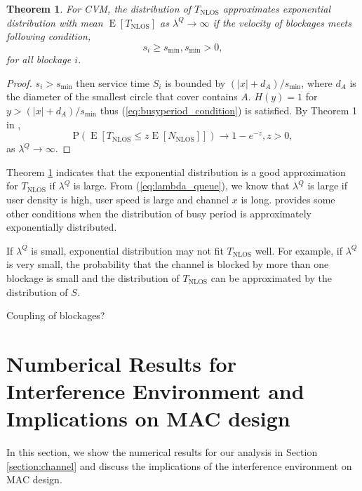 \documentclass[10pt, conference, letterpaper]{IEEEtran}
\newtheorem{theorem}{Theorem}
\DeclareMathOperator*{\E}{\mathrm{E}}
\DeclareMathOperator*{\NLOS}{\mathrm{NLOS}}
\begin{document}
\begin{theorem}\label{theorem:T_NLOS_exp}
For CVM, the distribution of $T_{\NLOS}$ approximates exponential distribution with mean $\E[T_{\NLOS}]$ as $\lambda^Q\rightarrow \infty$ if the velocity of blockages meets following condition,
\begin{equation}\label{condition:T_NLOS_exp}
s_i\geq s_{\min}, s_{\min}>0,
\end{equation} 
for all blockage $i$.
\end{theorem}

\begin{proof}
$s_i>s_{\min}$ then service time $S_i$ is bounded by $(|x|+d_A)/s_{\min}$, where $d_A$ is the diameter of the smallest circle that cover contains $A$. $H(y) = 1$ for $y>(|x|+d_A)/s_{\min}$ thus (\ref{eq:busyperiod_condition}) is satisfied. By Theorem 1 in \cite{busyperiod_heavytraffic}, 
\begin{equation*}
\mathrm{P}(\E[T_{\NLOS} \leq z\E[N_{\NLOS}]]) \rightarrow 1-e^{-z}, z>0,
\end{equation*} 
as $\lambda^Q\rightarrow \infty$.
\end{proof}

Theorem \ref{theorem:T_NLOS_exp} indicates that the exponential distribution is a good approximation for $T_{\NLOS}$ if $\lambda^Q$ is large. From (\ref{eq:lambda_queue}), we know that $\lambda^Q$ is large if user density is high, user speed is large and channel $x$ is long. \cite{busyperiod_exponential} provides some other conditions when the distribution of busy period is approximately exponentially distributed.
 
If $\lambda^Q$ is small, exponential distribution may not fit $T_{\NLOS}$ well. For example, if $\lambda^Q$ is very small, the probability that the channel is blocked by more than one blockage is small and the distribution of $T_{\NLOS}$ can be approximated by the distribution of $S$.

Coupling of blockages?


\section{Numberical Results for Interference Environment and Implications on MAC design} \label{section:channel_numerical}
In this section, we show the numerical results for our analysis in Section \ref{section:channel} and discuss the implications of the interference environment on MAC design. 
\end{document}
